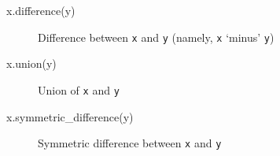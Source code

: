 \documentclass[
  letterpaper,
]{krantz}
\newenvironment{Shaded}{\begin{snugshade}}{\end{snugshade}}
\newcommand{\NormalTok}[1]{\textcolor[rgb]{0.00,0.23,0.31}{#1}}
\begin{document}
\begin{Shaded}
\begin{Highlighting}[]
\NormalTok{x.difference(y)}
\end{Highlighting}
\end{Shaded}

\begin{figure}[H]


\caption{\label{fig-difference}Difference between \texttt{x} and
\texttt{y} (namely, \texttt{x} `minus' \texttt{y})}

\end{figure}%

\begin{Shaded}
\begin{Highlighting}[]
\NormalTok{x.union(y)}
\end{Highlighting}
\end{Shaded}

\begin{figure}[H]


\caption{\label{fig-union}Union of \texttt{x} and \texttt{y}}

\end{figure}%

\begin{Shaded}
\begin{Highlighting}[]
\NormalTok{x.symmetric\_difference(y)}
\end{Highlighting}
\end{Shaded}

\begin{figure}[H]


\caption{\label{fig-symmetric-difference}Symmetric difference between
\texttt{x} and \texttt{y}}

\end{figure}%
\end{document}
